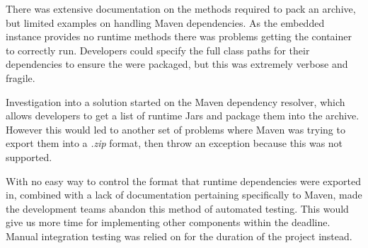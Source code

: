 \par
There was extensive documentation on the methods required to pack an archive, but limited examples on handling Maven dependencies. As the embedded instance provides no runtime methods there was problems getting the container to correctly run. Developers could specify the full class paths for their dependencies to ensure the were packaged, but this was extremely verbose and fragile.

\par
Investigation into a solution started on the Maven dependency resolver, which allows developers to get a list of runtime Jars and package them into the archive. However this would led to another set of problems where Maven was trying to export them into a \textit{.zip} format, then throw an exception because this was not supported.

\par
With no easy way to control the format that runtime dependencies were exported in, combined with a lack of documentation pertaining specifically to Maven, made the development teams abandon this method of automated testing. This would give us more time for implementing other components within the deadline. Manual integration testing was relied on for the duration of the project instead.
